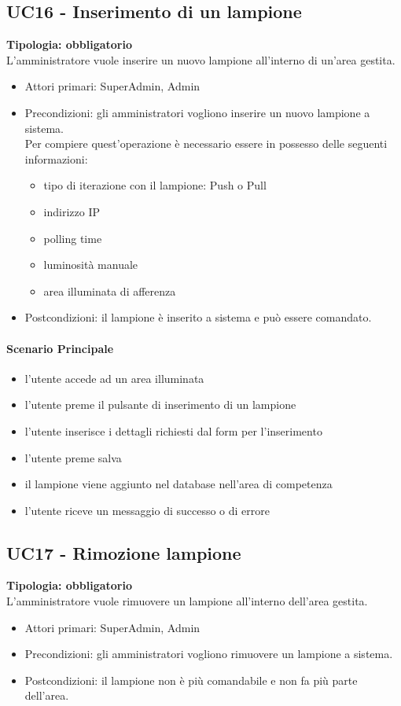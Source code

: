 \documentclass[12pt]{article}
\begin{document}
\subsection{UC16 - Inserimento di un lampione}
\textbf{Tipologia: obbligatorio}\\
L'amministratore vuole inserire un nuovo lampione all'interno di un'area gestita.
\begin{itemize}
	\item Attori primari: SuperAdmin, Admin
	\item Precondizioni: gli amministratori vogliono inserire un nuovo lampione a sistema.\\
	 Per compiere quest'operazione è necessario essere in possesso delle seguenti informazioni: 
	\begin{itemize}
		\item tipo di iterazione con il lampione: Push o Pull
		\item indirizzo IP
		\item polling time
		\item luminosità manuale
		\item area illuminata di afferenza
	\end{itemize}
	\item Postcondizioni: il lampione è inserito a sistema e può essere comandato.
\end{itemize}
\paragraph{Scenario Principale}
\begin{itemize}
	\item l'utente accede ad un area illuminata
	\item l'utente preme il pulsante di inserimento di un lampione
	\item l'utente inserisce i dettagli richiesti dal form per l'inserimento
	\item l'utente preme salva
	\item il lampione viene aggiunto nel database nell'area di competenza
	\item l'utente riceve un messaggio di successo o di errore
\end{itemize}


\subsection{UC17 - Rimozione lampione}
\textbf{Tipologia: obbligatorio}\\
L'amministratore vuole rimuovere un lampione all'interno dell'area gestita.
\begin{itemize}
	\item Attori primari: SuperAdmin, Admin
	\item Precondizioni: gli amministratori vogliono rimuovere un lampione a sistema.\\
	\item Postcondizioni: il lampione non è più comandabile e non fa più parte dell'area.
\end{itemize}
\end{document}

